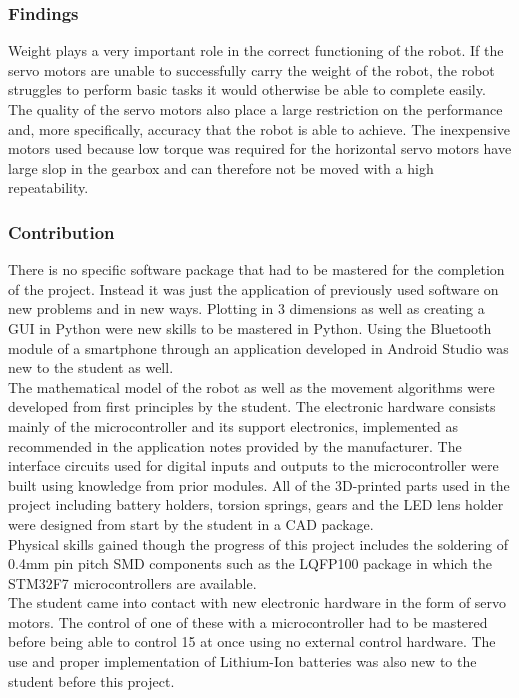\subsubsection*{Findings}
Weight plays a very important role in the correct functioning of the robot. If the servo motors are unable to successfully carry the weight of the robot, the robot struggles to perform basic tasks it would otherwise be able to complete easily. The quality of the servo motors also place a large restriction on the performance and, more specifically, accuracy that the robot is able to achieve. The inexpensive motors used because low torque was required for the horizontal servo motors have large slop in the gearbox and can therefore not be moved with a high repeatability.\\

\subsubsection*{Contribution}
There is no specific software package that had to be mastered for the completion of the project. Instead it was just the application of previously used software on new problems and in new ways. Plotting in 3 dimensions as well as creating a GUI in Python were new skills to be mastered in Python. Using the Bluetooth module of a smartphone through an application developed in Android Studio was new to the student as well.\\

The mathematical model of the robot as well as the movement algorithms were developed from first principles by the student. The electronic hardware consists mainly of the microcontroller and its support electronics, implemented as recommended in the application notes provided by the manufacturer. The interface circuits used for digital inputs and outputs to the microcontroller were built using knowledge from prior modules. All of the 3D-printed parts used in the project including battery holders, torsion springs, gears and the LED lens holder were designed from start by the student in a CAD package.\\

Physical skills gained though the progress of this project includes the soldering of 0.4mm pin pitch SMD components such as the LQFP100 package in which the STM32F7 microcontrollers are available.\\

The student came into contact with new electronic hardware in the form of servo motors. The control of one of these with a microcontroller had to be mastered before being able to control 15 at once using no external control hardware. The use and proper implementation of Lithium-Ion batteries was also new to the student before this project.\\